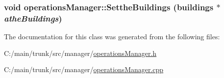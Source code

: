 \label{classoperations_manager_a324640de5c140025dbc909addb55d367}
\hypertarget{classoperations_manager_a882e3c3a3da0b153bc380a6e5d2a80c4}{
\subsubsection[{SettheBuildings}]{\setlength{\rightskip}{0pt plus 5cm}void operationsManager::SettheBuildings ({\bf buildings} $\ast$ {\em atheBuildings})}}
\label{classoperations_manager_a882e3c3a3da0b153bc380a6e5d2a80c4}


The documentation for this class was generated from the following files:\begin{DoxyCompactItemize}
\item 
C:/main/trunk/src/manager/\hyperlink{operations_manager_8h}{operationsManager.h}\item 
C:/main/trunk/src/manager/\hyperlink{operations_manager_8cpp}{operationsManager.cpp}\end{DoxyCompactItemize}
